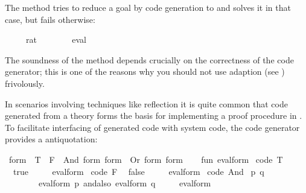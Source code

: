 \begin{isabellebody}
\begin{isamarkuptext}
  The \hyperlink{method.eval}{\mbox{}} method tries to reduce a goal by code generation to 
  and solves it in that case, but fails otherwise:%
\end{isamarkuptext}%
\isamarkuptrue%
%
\isadelimquote
%
\endisadelimquote
%
\isatagquote
{}\isamarkupfalse%
\ {\isachardoublequoteopen}{}{}\ {\isacharslash}\ {\isacharparenleft}{}{}\ {\isacharcolon}{\isacharcolon}\ rat{\isacharparenright}\ {\isacharequal}\ {}\ {\isacharslash}\ {}{\isachardoublequoteclose}\isanewline
\ \ \isamarkupfalse%
\ eval%
\endisatagquote
{\isafoldquote}%
%
\isadelimquote
%
\endisadelimquote
%
\begin{isamarkuptext}%
\noindent The soundness of the \hyperlink{method.eval}{\mbox{}} method depends crucially 
  on the correctness of the code generator;  this is one of the reasons
  why you should not use adaption (see ) frivolously.%
\end{isamarkuptext}%
\isamarkuptrue%
%
\isamarkuptrue%
%
\begin{isamarkuptext}%
In scenarios involving techniques like reflection it is quite common
  that code generated from a theory forms the basis for implementing
  a proof procedure in .  To facilitate interfacing of generated code
  with system code, the code generator provides a  antiquotation:%
\end{isamarkuptext}%
\isamarkuptrue%
%
\isadelimquote
%
\endisadelimquote
%
\isatagquote
{}\isamarkupfalse%
\ form\ {\isacharequal}\ T\ {\isacharbar}\ F\ {\isacharbar}\ And\ form\ form\ {\isacharbar}\ Or\ form\ form%
\endisatagquote
{\isafoldquote}%
%
\isadelimquote
%
\endisadelimquote
\isanewline
%
\isadelimquotett
%
\endisadelimquotett
%
\isatagquotett
{}\isamarkupfalse%
\ {\isacharverbatimopen}\isanewline
\ \ fun\ eval{\isacharunderscore}form\ %
\isaantiq
code\ T%
\endisaantiq
\ {\isacharequal}\ true\isanewline
\ \ \ \ {\isacharbar}\ eval{\isacharunderscore}form\ %
\isaantiq
code\ F%
\endisaantiq
\ {\isacharequal}\ false\isanewline
\ \ \ \ {\isacharbar}\ eval{\isacharunderscore}form\ {\isacharparenleft}%
\isaantiq
code\ And%
\endisaantiq
\ {\isacharparenleft}p{\isacharcomma}\ q{\isacharparenright}{\isacharparenright}\ {\isacharequal}\isanewline
\ \ \ \ \ \ \ \ eval{\isacharunderscore}form\ p\ andalso\ eval{\isacharunderscore}form\ q\isanewline
\ \ \ \ {\isacharbar}\ eval{\isacharunderscore}form\ {\isacharparenleft}%

\end{isabellebody}
